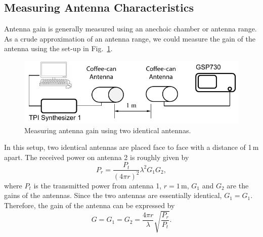 \documentclass[letterpaper, 11pt]{article}
\begin{document}
\subsection{Measuring Antenna Characteristics}

Antenna gain is generally measured using an anechoic chamber or antenna range. As a crude approximation of an antenna range, we could measure the gain of the antenna using the set-up in Fig.~\ref{fig:gain_measure}.
	\begin{figure}[ht]
		\centering	
		\includegraphics[width=4.5in]{gain_measure}
		\caption{Measuring antenna gain using two identical antennas.}
		\label{fig:gain_measure}
	\end{figure}
	
In this setup, two identical antennas are placed face to face with a distance of 1\,m apart. The received power on antenna 2 is roughly given by 
\[
	P_r = \frac{P_t}{\left( 4\pi r \right)^2} \lambda^2 G_1 G_2,
\]
where $P_t$ is the transmitted power from antenna 1, $r = 1$\,m, $G_1$ and $G_2$ are the gains of the antennas. Since the two antennas are essentially identical, $G_1 = G_1$. Therefore, the gain of the antenna can be expressed by 
\begin{equation}
	G = G_1 = G_2 =\frac{4\pi r}{\lambda}\sqrt{\frac{P_r}{P_t}}.
	\label{eqn:gain}
\end{equation}
\end{document}
